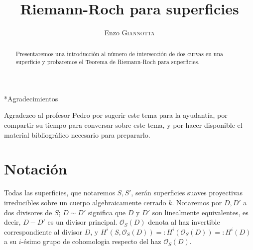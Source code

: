 \documentclass[spanish,12pt]{amsart}
\makeatletter
\renewcommand\subsection{\@startsection{subsection}{2}%
  \z@{.5\linespacing\@plus.7\linespacing}{-.5em}%
  {\normalfont\sffamily}}
\theoremstyle{definition}
\theoremstyle{remark}
\numberwithin{equation}{section}
\renewcommand{\O}{\mathcal{O}}
\newcommand{\fiveknot}{%
\begin{tikzpicture}[transform canvas={scale=0.1}]
\begin{knot}[
  consider self intersections=true,
  flip crossing/.list={2,4},
  only when rendering/.style={
  }
]
\strand[black, line width=8pt] (2,0) .. controls +(0,1) and +(54:1.0) .. (144:2) .. controls +(54:-1.0) and +(18:-1.0) .. (-72:2) .. controls +(18:1.0) and +(162:-1.0) .. (72:2) .. controls +(162:1.0) and +(126:1.0) .. (-144:2) .. controls +(126:-1.0) and +(0,-1.0) .. (2,0);
\end{knot}
\end{tikzpicture}
}
\makeatother
\begin{document}
\renewcommand{\qedsymbol}{\fiveknot}

\title{Riemann-Roch para superficies}

\author{Enzo \textsc{Giannotta}}





\begin{abstract}
Presentaremos una introducción al número de intersección de dos curvas en una superficie y probaremos el Teorema de Riemann-Roch para superficies.
\end{abstract}

\maketitle

\tableofcontents








\subsection*{Agradecimientos}

Agradezco al profesor Pedro por sugerir este tema para la ayudantía, por compartir su tiempo para conversar sobre este tema, y por hacer disponible el material bibliográfico necesario para prepararlo.


\section{Notación}

Todas las superficies, que notaremos $S,S'$, serán superficies suaves proyectivas irreducibles sobre un cuerpo algebraicamente cerrado $k$. Notaremos por $D,D'$ a dos divisores de $S$; $D\sim D'$ significa que $D$ y $D'$ son linealmente equivalentes, es decir, $D-D'$ es un divisor principal. $\O_S (D)$ denota al haz invertible correspondiente al divisor $D$, y $H^i (S, \O_S (D)) =: H^i (\O_S (D)) =: H^i (D)$ a su $i$-ésimo grupo de cohomologia respecto del haz $\O_S (D)$.
\end{document}
